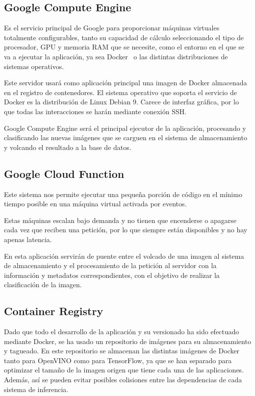 \subsection{Google Compute Engine}\label{subsec:computeengine}
Es el servicio principal de Google para proporcionar máquinas virtuales totalmente configurables, tanto su capacidad de cálculo seleccionando el tipo de procesador, GPU y memoria RAM que se necesite, como el entorno en el que se va a ejecutar la aplicación, ya sea Docker~\cite{docker} o las distintas distribuciones de sistemas operativos.

Este servidor usará como aplicación principal una imagen de Docker almacenada en el registro de contenedores. El sistema operativo que soporta el servicio de Docker es la distribución de Linux Debian 9. Carece de interfaz gráfica, por lo que todas las interacciones se harán mediante conexión SSH.

Google Compute Engine será el principal ejecutor de la aplicación, procesando y clasificando las nuevas imágenes que se carguen en el sistema de almacenamiento y volcando el resultado a la base de datos.

\subsection{Google Cloud Function}\label{subsec:cloudfunction}
Este sistema nos permite ejecutar una pequeña porción de código en el mínimo tiempo posible en una máquina virtual activada por eventos.

Estas máquinas escalan bajo demanda y no tienen que encenderse o apagarse cada vez que reciben una petición, por lo que siempre están disponibles y no hay apenas latencia.

En esta aplicación servirán de puente entre el volcado de una imagen al sistema de almacenamiento y el procesamiento de la petición al servidor con la información y metadatos correspondientes, con el objetivo de realizar la clasificación de la imagen.

\subsection{Container Registry}\label{subsec:container-registry}
Dado que todo el desarrollo de la aplicación y su versionado ha sido efectuado mediante Docker, se ha usado un repositorio de imágenes para su almacenamiento y tagueado.
En este repositorio se almacenan las distintas imágenes de Docker tanto para OpenVINO como para TensorFlow, ya que se han separado para optimizar el tamaño de la imagen origen que tiene cada una de las aplicaciones. Además, así se pueden evitar posibles colisiones entre las dependencias de cada sistema de inferencia.

